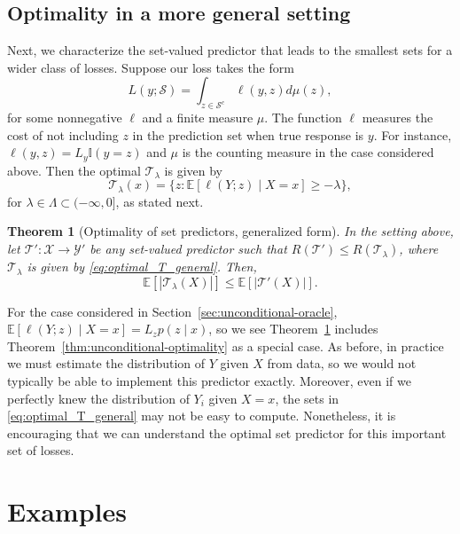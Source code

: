\documentclass[10pt]{article}
\newtheorem{theorem}{Theorem}
\def\I{\mathbb{I}}
\def\E{\mathbb{E}}
\newcommand{\Y}{\mathcal{Y}}
\newcommand{\T}{\mathcal{T}}
\renewcommand{\S}{\mathcal{S}}
\begin{document}
\subsection{Optimality in a more general setting}
Next, we characterize the set-valued predictor that leads to the smallest sets for a wider class of losses. Suppose our loss takes the form
\begin{equation}
    L(y; \S) = \int_{z\in \S^c}\ell(y, z)d\mu(z),
\end{equation}
for some nonnegative $\ell$ and a finite measure $\mu$. The function $\ell$ measures the cost of not including $z$ in the prediction set when true response is $y$. For instance, $\ell(y, z) = L_y \I(y = z)$ and $\mu$ is the counting measure in the case considered above. 
Then the optimal $\T_\lambda$ is given by
\begin{equation}
\T_\lambda(x) = \{z: \E[\ell(Y; z)\mid X = x]\ge -\lambda\},
\label{eq:optimal_T_general}
\end{equation}
for $\lambda \in \Lambda \subset (-\infty, 0]$, as stated next.
\begin{theorem}[Optimality of set predictors, generalized form]
In the setting above, let $\T':\mathcal{X} \to \Y'$ be any set-valued predictor such that $R(\T') \leq R(\T_\lambda)$, where $\T_\lambda$ is given by \eqref{eq:optimal_T_general}.
Then,
\begin{equation}
\E[|\T_{\lambda}(X)|] \leq \E[|\T'(X)|].
\end{equation}
\label{thm:unconditional-optimality-ext}
\vspace{-0.5cm}
\end{theorem}
For the case considered in Section~\ref{sec:unconditional-oracle}, $\E[\ell(Y; z)\mid X = x] = L_{z}p(z \mid x)$, so we see Theorem~\ref{thm:unconditional-optimality-ext} includes Theorem~\ref{thm:unconditional-optimality} as a special case. As before, in practice we must estimate the distribution of $Y$ given $X$ from data, so we would not typically be able to implement this predictor exactly. Moreover, even if we perfectly knew the distribution of $Y_i$ given $X = x$, the sets in \eqref{eq:optimal_T_general} may not be easy to compute. Nonetheless, it is encouraging that we can understand the optimal set predictor for this important set of losses.

\section{Examples}
\label{sec:experiments}
\end{document}
